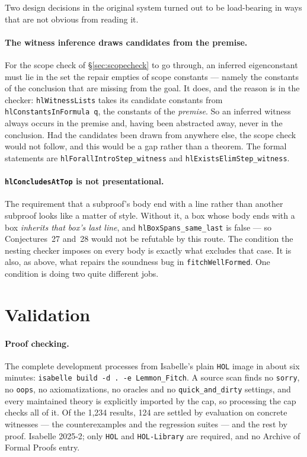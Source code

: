 \documentclass[11pt]{article}
\theoremstyle{plain}
\newcommand{\ubrk}{\_\discretionary{}{}{}}
\newcommand{\isa}[1]{\textup{\texttt{\small #1}}}
\begin{document}
Two design decisions in the original system turned out to be load-bearing in
ways that are not obvious from reading it.

\paragraph{The witness inference draws candidates from the premise.}
For the scope check of \S\ref{sec:scopecheck} to go through, an inferred
eigenconstant must lie in the set the repair empties of scope constants ---
namely the constants of the conclusion that are missing from the goal. It does,
and the reason is in the checker: \isa{hlWitnessLists} takes its candidate
constants from \isa{hlConstantsInFormula q}, the constants of the
\emph{premise}. So an inferred witness always occurs in the premise and, having
been abstracted away, never in the conclusion. Had the candidates been drawn
from anywhere else, the scope check would not follow, and this would be a gap
rather than a theorem. The formal statements are
\isa{hlForallIntroStep\ubrk{}witness} and \isa{hlExistsElimStep\ubrk{}witness}.

\paragraph{\isa{hlConcludesAtTop} is not presentational.}
The requirement that a subproof's body end with a line rather than another
subproof looks like a matter of style. Without it, a box whose body ends with a
box \emph{inherits that box's last line}, and \isa{hlBoxSpans\ubrk{}same\ubrk{}last} is
false --- so Conjectures~27 and~28 would not be refutable by this route. The
condition the nesting checker imposes on every body is exactly what excludes
that case. It is also, as above, what repairs the soundness bug in
\isa{fitchWellFormed}. One condition is doing two quite different jobs.

\section{Validation}\label{sec:validation}

\paragraph{Proof checking.} The complete development processes from Isabelle's
plain \isa{HOL} image in about six minutes:
\isa{isabelle build -d . -e Lemmon\ubrk{}Fitch}. A source scan finds no \isa{sorry},
no \isa{oops}, no axiomatizations, no oracles and no \isa{quick\ubrk{}and\ubrk{}dirty}
settings, and every maintained theory is explicitly imported by the cap, so
processing the cap checks all of it. Of the 1{,}234 results, 124 are settled by
evaluation on concrete witnesses --- the counterexamples and the regression
suites --- and the rest by proof. Isabelle 2025-2; only \isa{HOL} and
\isa{HOL-Library} are required, and no Archive of Formal Proofs entry.
\end{document}
